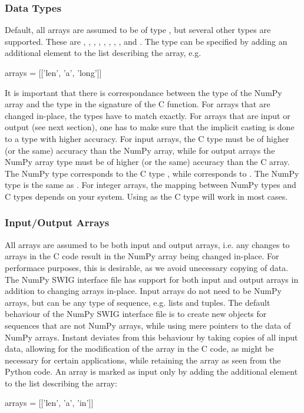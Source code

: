 \subsubsection{Data Types}
Default, all arrays are assumed to be of type , but several other
types are supported. These
are , , , , , , , ,
and . The type can be specified by adding an
additional element to the list describing the array, e.g.
\begin{code}
arrays = [['len', 'a', 'long']]
\end{code}
It is important that there is correspondance between the type of the NumPy
array and the type in the signature of the C function. For arrays that are
changed in-place, the types have to match exactly. For arrays that are input or
output (see next section), one has to make sure that the implicit casting is done to a type with
higher accuracy. For input arrays, the C type must be of higher (or the
same) accuracy than the NumPy array, while for output arrays the NumPy array
type must be of higher (or the same) accuracy than the C array. The NumPy
type  corresponds to the C type , while 
corresponds to . The NumPy type  is the same
as . For integer arrays, the mapping
between NumPy types and C types depends on your system. Using  as
the C type will work in most cases.

\subsubsection{Input/Output Arrays}
All arrays are assumed to be both input and output arrays, i.e. any changes to
arrays in the C code result in the NumPy array being changed in-place. For
performace purposes, this is desirable, as we avoid unecessary copying of
data. The NumPy SWIG interface file has support for both input and output
arrays in addition to changing arrays in-place. Input arrays do not need to be
NumPy arrays, but can be any type of sequence, e.g. lists and tuples. The
default behaviour of the NumPy SWIG interface file is to create new objects
for sequences that are not NumPy arrays, while using mere pointers to the data
of NumPy arrays. Instant deviates from this behaviour by taking copies of all
input data, allowing for the modification of the array in the C code, as might
be necessary for certain applications, while retaining the array as seen from
the Python code. An array is marked as input only by adding the additional element 
to the list describing the array:
\begin{code}
arrays = [['len', 'a', 'in']]
\end{code}

